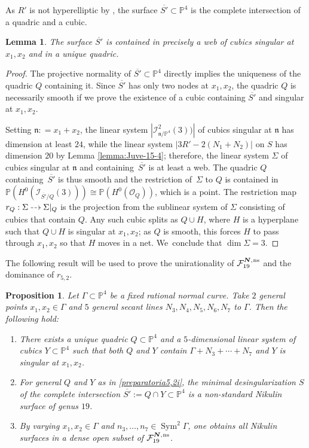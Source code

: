 \documentclass[JEP,XML,SOM,Unicode,NoEqCountersInSection,published]{cedram}
\newcommand{\ns}{{\mkern1mu\mathrm{ns}}}
\newcommand{\bN}{\boldsymbol{N}}
\newcommand{\dradpl}{{\hspace*{-2.5mm}\begin{tikzcd}[ampersand replacement=\&,column sep = scriptsize]\mbox{}\ar[r,dashed]\&\mbox{}\end{tikzcd}\hspace*{-2.5mm}}}
\newcommand{\dratst}{{\hspace*{-2mm}\begin{tikzcd}[ampersand replacement=\&,column sep = small]\mbox{}\ar[r,dashed]\&\mbox{}\end{tikzcd}\hspace*{-2mm}}}
\let\drascst\dratst
\newcommand{\dra}{\mathchoice{\dradpl}{\dratst}{\drascst}{\drascst}}
\theoremstyle{plain}
\newtheorem{lemma}[thm]{Lemma}
\newtheorem{prop}[thm]{Proposition}
\theoremstyle{definition}
\DeclareMathOperator{\Sym}{Sym}
\newcommand\PP{{\mathbb P}}
\newcommand\F{{\mathcal F}}
\newcommand\I{{\mathcal I}}
\renewcommand\O{{\mathcal O}}
\begin{document}
As $R'$ is not hyperelliptic by \cite[Prop.\,5.6]{DL}, the surface $\overline{S'}\subset \PP^4$ is the complete intersection of a quadric and a cubic.

\begin{lemma} \label{lemma:incubichesing2}
The surface $\overline{S'}$ is contained in precisely a web of cubics singular at $x_1,x_2$ and in a unique quadric.
\end{lemma}

\begin{proof}
The projective normality of $\overline{S'}\subset \mathbb P^4$ directly implies the uniqueness of the quadric $Q$ containing it. Since $\overline{S'}$ has only two nodes at $x_1,x_2$, the quadric $Q$ is necessarily smooth if we prove the existence of a cubic containing $\overline{S'}$ and singular at $x_1,x_2$.

Setting $\mathfrak{n}: = x_1 + x_2 $, the linear system $|\I^2_{\mathfrak{n}/\PP^4}(3))|$ of cubics singular at $\mathfrak n$ has dimension at least $24$, while the linear system $|3R'-2(N_1+N_2)|$ on $S$ has dimension $20$ by Lemma \ref{lemma:Juve-15-4}; therefore, the linear system $\Sigma$ of cubics singular at $\mathfrak n$ and containing~$\overline{S'}$ is at least a web. The quadric $Q$ containing~$\overline{S'}$ is thus smooth and the restriction of~$\Sigma$ to $Q$ is contained in $\mathbb P(H^0(\I_{\overline{S'}/Q}(3))) \cong \mathbb P(H^0(\O_Q))$, which is a point. The restriction map $r_Q:\Sigma \dra \Sigma|_Q$ is the projection from the sublinear system of $\Sigma$ consisting of cubics that contain $Q$. Any such cubic splits as $Q\cup H$, where $H$ is a hyperplane such that $Q \cup H$ is singular at $x_1,x_2$; as $Q$ is smooth, this forces $H$ to pass through $x_1,x_2$ so that $H$ moves in a net. We~conclude that $\dim\Sigma=3$.
\end{proof}

The following result will be used to prove the unirationality of $\F_{19}^{\bN,\ns}$ and the dominance of $r_{5,2}$.

\begin{prop}\label{preparatoria5,2}
Let $\Gamma\subset\PP^4$ be a fixed rational normal curve. Take $2$ general points $x_1,x_2 \in \Gamma$ and $5$ general secant lines $N_3,N_4,N_5,N_6,N_7$ to $\Gamma$. Then the following hold:
\begin{enumerate}
\item\label{preparatoria5,2i}
There exists a unique quadric $Q \subset\mathbb P^4$ and a $5$-dimensional linear system of cubics $Y\subset\mathbb P^4$ such that both $Q$ and $Y$ contain $\Gamma+N_3+\cdots+N_7$ and $Y$ is singular at $x_1,x_2$.
\item\label{preparatoria5,2ii}
For general $Q$ and $Y$ as in \eqref{preparatoria5,2i}, the minimal desingularization $S$ of the complete intersection $\overline{S'}:= Q\cap Y\subset \PP^4$ is a non-standard Nikulin surface of genus $19$.
\item\label{preparatoria5,2iii}
By varying $x_1,x_2 \in \Gamma$ and $n_3,\ldots,n_7\in \Sym^2\Gamma$, one obtains all Nikulin surfaces in a dense open subset of $\F_{19}^{\bN,\ns}$.
\end{enumerate}
\end{prop}
\end{document}
